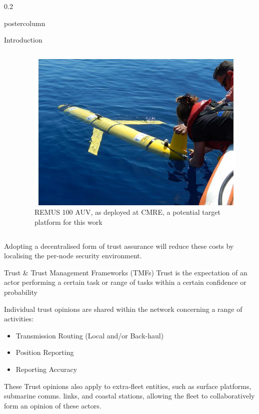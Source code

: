 \documentclass[final,hyperref={pdfpagelabels=false}]{beamer}
\def\colwidth{0.2\linewidth}
\begin{document}
\begin{frame}[fragile]
\begin{columns}[T]
\begin{column}{\colwidth}
\begin{beamercolorbox}[center,wd=\textwidth]{postercolumn}
\begin{minipage}[T]{.99\textwidth}
{\begin{block}{Introduction}
\begin{columns}[T]
\begin{column}{0.416\textwidth}
								\end{column}
								\begin{column}{0.416\textwidth}
									\begin{figure}[h]
										\centering
										\includegraphics[width=0.8\linewidth]{remus100cmre}
										\vspace{1ex}
										\caption{REMUS 100 AUV, as deployed at CMRE, a potential target platform for this work}
									\end{figure}
								\end{column}
							\end{columns}
							\vspace{0.25\baselineskip}
							Adopting a decentralised form of trust assurance will reduce these costs by localising the per-node security environment.
						\end{block}
						\begin{block}{Trust \& Trust Management Frameworks (TMFs)}
							Trust is the expectation of an actor performing a certain task or range of tasks within a certain confidence or probability
														
							Individual trust opinions are shared within the network concerning a range of activities:
							\begin{itemize}
								\item Transmission Routing (Local and/or Back-haul)
								\item Position Reporting
								\item Reporting Accuracy
							\end{itemize}
							\vspace{0.25\baselineskip}
														
							These Trust opinions also apply to extra-fleet entities, such as surface platforms, submarine comms. links, and coastal stations, allowing the fleet to collaboratively form an opinion of these actors.
							

\end{block}}
\end{minipage}
\end{beamercolorbox}
\end{column}
\end{columns}
\end{frame}
\end{document}
